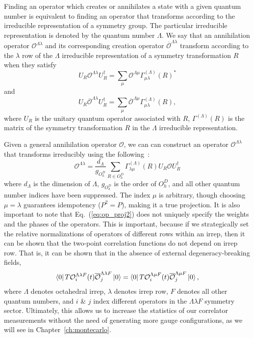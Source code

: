    Finding an operator which creates or annihilates a state with a given quantum number is equivalent to finding an operator that transforms according to the irreducible representation of a symmetry group. The particular irreducible representation is denoted by the quantum number $\Lambda$. We say that an annihilation operator $\mathcal O^{\Lambda \lambda}$ and its 
    corresponding creation operator $\overline{\mathcal O}^{\Lambda \lambda}$ transform according to the $\lambda$ row of the $\Lambda$ irreducible representation of a symmetry transformation $R$ when they satisfy
    \begin{equation}
        U_R \mathcal O^{\Lambda \lambda} U_R^\dagger = \sum_\mu \mathcal O^{\Lambda \mu} \Gamma_{\mu \lambda}^{(\Lambda)}(R)^*
    \end{equation}
    and
    \begin{equation}
        U_R \overline{\mathcal O}^{\Lambda \lambda} U_R^\dagger = \sum_\mu \overline{\mathcal O}^{\Lambda \mu} \Gamma_{\mu \lambda}^{(\Lambda)}(R),
    \end{equation}
    where $U_R$ is the unitary quantum operator associated with $R$, $\Gamma^{(\Lambda)}(R)$ is the matrix of the symmetry transformation $R$ in the $\Lambda$ irreducible representation.

    Given a general annihilation operator $\mathcal O$, we can can construct an operator $\mathcal O^{\Lambda \lambda}$ that transforms irreducibly using the following~\cite{spectroscopy}:
    \begin{equation}\label{eq:op_proj2}
        \mathcal O^{\Lambda \lambda} = \frac{d_\Lambda}{g_{O_h^D}}\sum_{R\in O_h^D} \Gamma^{(\Lambda)}_{\lambda \mu}(R) U_R \mathcal O U_R^\dagger
    \end{equation}
    where $d_\Lambda$ is the dimension of $\Lambda$, $g_{O_h^D}$ is the order of $O_h^D$, and all other quantum number indices have been suppressed. The index $\mu$ is arbitrary, though choosing $\mu = \lambda$ guarantees idempotency ($P^2=P$), making it a true projection. It is also important to note that Eq.~(\ref{eq:op_proj2}) does not uniquely specify the weights and the phases of the operators. This is important, because if we strategically set the relative normalizations of operators of different rows within an irrep, then it can be shown that the two-point correlation functions do not depend on irrep row. That is, it can be shown that in the absence of external degeneracy-breaking fields,
    \begin{equation}
        \bra{0}T \mathcal{O}_i^{\Lambda \lambda F}(t) \overline{\mathcal O}_j^{\Lambda \lambda F}\ket{0} = \bra{0}T \mathcal{O}_i^{\Lambda \mu F}(t) \overline{\mathcal O}_j^{\Lambda \mu F}\ket{0},
    \end{equation}
    where $\Lambda$ denotes octahedral irrep, $\lambda$ denotes irrep row, $F$ denotes all other quantum numbers, and $i$ \& $j$ index different operators in the $\Lambda\lambda F$ symmetry sector. Ultimately, this allows us to increase the statistics of our correlator measurements without the need of generating more gauge configurations, as we will see in Chapter~\ref{ch:montecarlo}.
    
